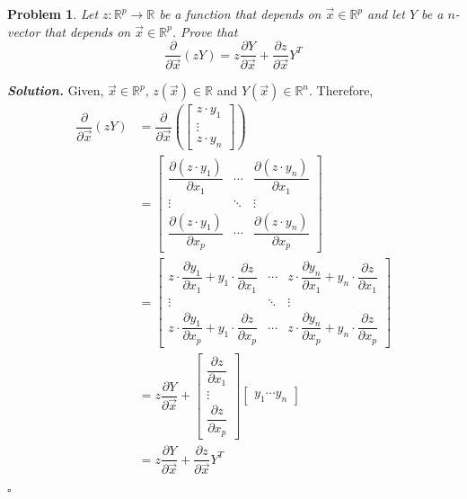 \documentclass[11pt]{amsart}
\newtheorem{problem}{Problem}
\newenvironment{solution}[1][\it{Solution}]{\textbf{#1. } }{$\square$}
\theoremstyle{definition}
\newcommand{\R}{\mathbb{R}}
\newcommand{\vx}{\vec{x}}
\begin{document}
\begin{problem}
Let $z:\R^p 
  \to \R$ be a function that depends on $\vx\in \R^p$ and let $Y$ be a $n$-vector that depends on $\vx\in \R^p$. Prove that
   $$
 \dfrac{\partial  }{\partial \vx} (z Y)=z
  \dfrac{\partial  Y}{\partial \vx}+
   \dfrac{\partial z}{\partial \vx} Y^T
 $$
   
\end{problem}
\begin{solution}
Given, $\vx \in \R^p$, $z(\vx) \in \R$ and $Y(\vx) \in \R^n$. Therefore,
\begin{align*}
\dfrac{\partial  }{\partial \vx} (z Y) &= \dfrac{\partial  }{\partial \vx} \left( \begin{bmatrix}z \cdot y_1\\\vdots\\ z \cdot y_n\end{bmatrix} \right)\\
&= \left[\begin{array}{ccc}\dfrac{\partial (z \cdot y_1)}{\partial x_1} & \cdots & \dfrac{\partial (z \cdot y_n)}{\partial x_1} \\ \vdots & \ddots & \vdots \\ \dfrac{\partial (z \cdot y_1)}{\partial x_p} & \cdots & \dfrac{\partial (z \cdot y_n)}{\partial x_p}\end{array}\right]\\
&= \left[\begin{array}{ccc}z \cdot \dfrac{\partial y_1}{\partial x_1} + y_1 \cdot \dfrac{\partial z}{\partial x_1} & \cdots & z \cdot \dfrac{\partial y_n}{\partial x_1} + y_n \cdot \dfrac{\partial z}{\partial x_1} \\ \vdots & \ddots & \vdots \\ z \cdot \dfrac{\partial y_1}{\partial x_p} + y_1 \cdot \dfrac{\partial z}{\partial x_p} & \cdots & z \cdot \dfrac{\partial y_n}{\partial x_p} + y_n \cdot \dfrac{\partial z}{\partial x_p}\end{array}\right]\\
&= z \dfrac{\partial Y}{\partial \vx} + \begin{bmatrix}\dfrac{\partial z}{\partial x_1}\\\vdots\\\dfrac{\partial z}{\partial x_p}\end{bmatrix} \begin{bmatrix}y_1 \cdots y_n\end{bmatrix}\\
&= z \dfrac{\partial Y}{\partial \vx} + \dfrac{\partial z}{\partial \vx} Y^T
\end{align*}

\end{solution}
\end{document}
